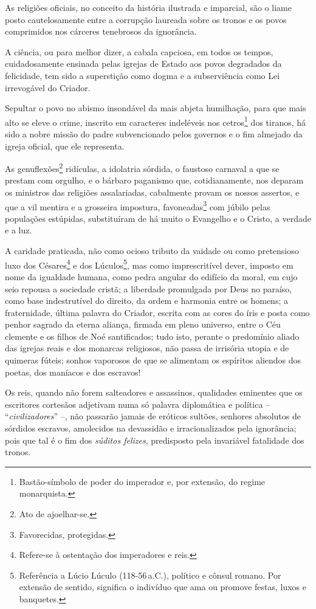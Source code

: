 As religiões oficiais, no conceito da história ilustrada e imparcial,
são o liame posto cautelosamente entre a corrupção laureada sobre os
tronos e os povos comprimidos nos cárceres tenebrosos da ignorância.

A ciência, ou para melhor dizer, a cabala capciosa, em todos os tempos,
cuidadosamente ensinada pelas igrejas de Estado aos povos degradados da
felicidade, tem sido a superstição como dogma e a subserviência como Lei
irrevogável do Criador.

Sepultar o povo no abismo insondável da mais abjeta humilhação, para que
mais alto se eleve o crime, inscrito em caracteres indeléveis nos
cetros\footnote{Bastão-símbolo de poder do imperador e, por extensão,
  do regime monarquista.} dos tiranos, há sido a nobre missão do padre
subvencionado pelos governos e o fim almejado da igreja oficial, que ele
representa.

As genuflexões\footnote{Ato de ajoelhar-se.} ridículas, a idolatria
sórdida, o faustoso carnaval a que se prestam com orgulho, e o bárbaro
paganismo que, cotidianamente, nos deparam os ministros das religiões
assalariadas, cabalmente provam os nossos assertos, e que a vil mentira
e a grosseira impostura, favoneadas\footnote{Favorecidas, protegidas.}
com júbilo pelas populações estúpidas, substituíram de há muito o
Evangelho e o Cristo, a verdade e a luz.

A caridade praticada, não como ocioso tributo da vaidade ou como
pretensioso luxo dos Césares\footnote{Refere-se à ostentação dos
  imperadores e reis.} e dos Lúculos\footnote{Referência a Lúcio
  Lúculo (118-56\,a.C.), político e cônsul romano. Por extensão de
  sentido, significa o indivíduo que ama ou promove festas, luxos e
  banquetes.}, mas como imprescritível dever, imposto em nome da
igualdade humana, como pedra angular do edifício da moral, em cujo seio
repousa a sociedade cristã; a liberdade promulgada por Deus no paraíso,
como base indestrutível do direito, da ordem e harmonia entre os homens;
a fraternidade, última palavra do Criador, escrita com as cores do íris
e posta como penhor sagrado da eterna aliança, firmada em pleno
universo, entre o Céu clemente e os filhos de Noé santificados; tudo
isto, perante o predomínio aliado das igrejas reais e dos monarcas
religiosos, não passa de irrisória utopia e de quimeras fúteis; sonhos
vaporosos de que se alimentam os espíritos aliendos dos poetas, dos
maníacos e dos escravos!

Os reis, quando não forem salteadores e assassinos, qualidades eminentes
que os escritores cortesãos adjetivam numa só palavra diplomática e
política -- ``\emph{civilizadores}'' --, não passarão jamais de eróticos
sultões, senhores absolutos de sórdidos escravos, amolecidos na
devassidão e irracionalizados pela ignorância; pois que tal é o fim dos
\emph{súditos felizes}, predisposto pela invariável fatalidade dos
tronos.

